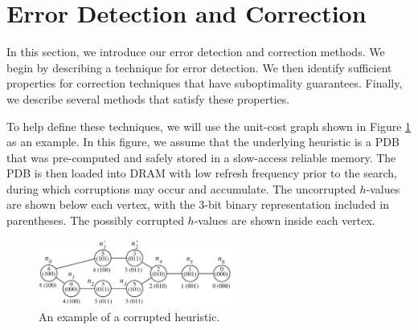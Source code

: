 \documentclass{article}
\begin{document}


\section{Error Detection and Correction}

In this section, we introduce our error detection and correction methods. We begin by describing a technique for error detection. We then identify sufficient properties for correction techniques that have suboptimality guarantees. Finally, we describe several methods that satisfy these properties.

To help define these techniques, we will use the unit-cost graph shown in Figure \ref{fig:corruption_example} as an example.
In this figure, we assume that the underlying heuristic is a PDB that was pre-computed and safely stored in a slow-access reliable memory. The PDB is then loaded into DRAM with low refresh frequency prior to the search, during which corruptions may occur and accumulate.
The uncorrupted $h$-values are shown below each vertex, with the 3-bit binary representation included in parentheses. The possibly corrupted $h$-values are shown inside each vertex.



\begin{figure}[t]
\begin{center}
\includegraphics[width=240px]{figures/corruption_example5.pdf}
\caption{An example of a corrupted heuristic.}
\label{fig:corruption_example}
\end{center}
\end{figure}
\end{document}
